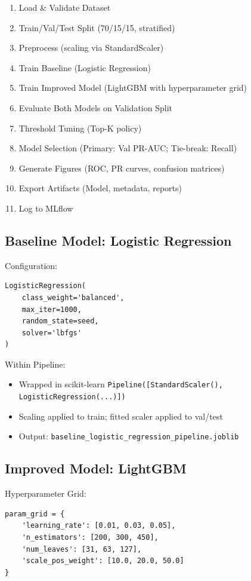 \documentclass[12pt,a4paper]{article}
\newcommand{\code}[1]{\texttt{#1}}
\begin{document}
\begin{enumerate}
    \item Load \& Validate Dataset
    \item Train/Val/Test Split (70/15/15, stratified)
    \item Preprocess (scaling via StandardScaler)
    \item Train Baseline (Logistic Regression)
    \item Train Improved Model (LightGBM with hyperparameter grid)
    \item Evaluate Both Models on Validation Split
    \item Threshold Tuning (Top-K policy)
    \item Model Selection (Primary: Val PR-AUC; Tie-break: Recall)
    \item Generate Figures (ROC, PR curves, confusion matrices)
    \item Export Artifacts (Model, metadata, reports)
    \item Log to MLflow
\end{enumerate}

\subsection{Baseline Model: Logistic Regression}

Configuration:
\begin{lstlisting}
LogisticRegression(
    class_weight='balanced',
    max_iter=1000,
    random_state=seed,
    solver='lbfgs'
)
\end{lstlisting}

Within Pipeline:
\begin{itemize}
    \item Wrapped in scikit-learn \code{Pipeline([StandardScaler(), LogisticRegression(...)])}
    \item Scaling applied to train; fitted scaler applied to val/test
    \item Output: \code{baseline\_logistic\_regression\_pipeline.joblib}
\end{itemize}

\subsection{Improved Model: LightGBM}

Hyperparameter Grid:
\begin{lstlisting}
param_grid = {
    'learning_rate': [0.01, 0.03, 0.05],
    'n_estimators': [200, 300, 450],
    'num_leaves': [31, 63, 127],
    'scale_pos_weight': [10.0, 20.0, 50.0]
}
\end{lstlisting}
\end{document}
